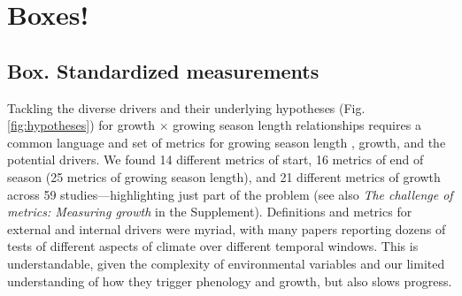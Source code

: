 \documentclass[11pt]{article}
\begin{document}

\newpage
\section{Boxes!}
\subsection*{Box. Standardized measurements} %

Tackling the diverse drivers and their underlying hypotheses (Fig. \ref{fig:hypotheses}) for growth $\times$ growing season length relationships requires a common language and set of metrics for growing season length \citep{korner2023four}, growth, and the potential drivers. We found 14 different metrics of start, 16 metrics of end of season (25 metrics of growing season length), and 21 different metrics of growth across 59 studies---highlighting just part of the problem (see also \emph{The challenge of metrics: Measuring growth} in the Supplement). Definitions and metrics for external and internal drivers were myriad, %
with many papers reporting dozens of tests of different aspects of climate over different temporal windows. This is understandable, given the complexity of environmental variables and our limited understanding of how they trigger phenology and growth, but also slows progress. 
\end{document}
